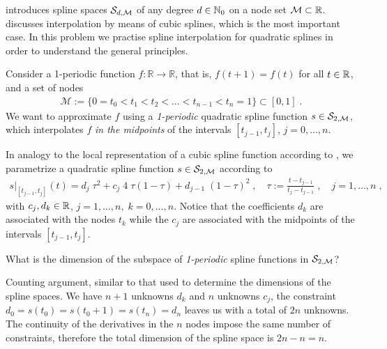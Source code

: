 

\begin{problem} \label{prb:QuadraticSplines}

 introduces spline spaces ${\cal S}_{d,{\cal M}}$ of any degree
{$d\in\mathbb{N}_{0}$} on a node set ${\cal M}\subset\mathbb{R}$.  discusses
interpolation by means of cubic splines, which is the most important case.
In this problem we practise spline interpolation for quadratic splines
in order to understand the general principles.

Consider a 1-periodic function $f: \mathbb{R} \rightarrow \mathbb{R}$, that is,
$f(t+1)=f(t)$ for all $t\in\mathbb{R}$, and a set of nodes
\begin{gather*}%
\mathcal{M}:=\{0=t_0<t_{1}<t_{2}<\dots<t_{n-1}<t_n=1\}\subset[0,1]\;.
\end{gather*}
We want to approximate $f$ using a \emph{1-periodic} quadratic spline function
$s\in{\cal S}_{2,{\cal M}}$, which interpolates $f$ \emph{in the midpoints} of the intervals
$[t_{j-1},t_{j}]$, $j=0,\ldots,n$.

In analogy to the local representation of a cubic spline function according to
, we parametrize a quadratic spline function
$s\in\mathcal{S}_{2,{\cal M}}$ according to
\begin{gather} \label{eq:quad_spl}
s|_{[t_{j-1},t_{j}]}(t) = d_{j}\;\tau^{2} + c_{j}\;4\;\tau(1-\tau) + d_{j-1}\;(1-\tau)^{2}\;,
\quad \tau := \frac{t-t_{j-1}}{t_{j}-t_{j-1}}\;,\quad
j=1,\ldots,n\;,
\end{gather}
with $c_j,d_k\in\mathbb{R}$, $j=1,\ldots,n,\; k=0,\ldots,n$.
Notice that the coefficients $d_k$ are associated with the nodes $t_k$ while the $c_j$ are associated with the midpoints of the intervals $[t_{j-1},t_j]$.



\begin{subproblem}[1] \label{subprb:QuadraticSplines_1}
What is the dimension of the subspace of \emph{1-periodic} spline functions in ${\cal S}_{2,{\cal M}}$?

\begin{solution} Counting argument, similar to that used to determine the
  dimensions of the spline spaces. We have $n+1$ unknowns $d_k$ and $n$ unknowns
  $c_j$, the constraint $d_0=s(t_0) = s(t_0+1) = s(t_n) = d_n$ leaves us with a
  total of $2n$ unknowns.  The continuity of the derivatives in the $n$ nodes
  impose the same number of constraints, therefore the total dimension of the
  spline space is $2n-n=n$.
\end{solution}
\end{subproblem}


\end{problem}
